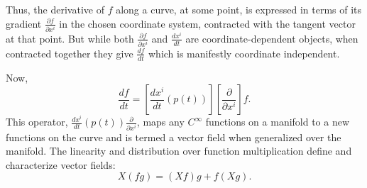 \documentclass{article}
\begin{document}
Thus, the derivative of $f$ along a curve, at some point, is expressed in terms of its gradient $\frac{\partial f}{\partial x^i}$ in the chosen coordinate system, contracted with the tangent vector at that point. But while both $\frac{\partial f}{\partial x^i}$ and $\frac{dx^i}{dt}$ are coordinate-dependent objects, when contracted together they give $\frac{df}{dt}$ which is manifestly coordinate independent. 

Now, 
\[
\frac{df}{dt} = \left[ \frac{dx^i}{dt} (p(t)) \right] \left[ \frac{\partial}{\partial x^i} \right] f.
\]
This operator, $\frac{dx^i}{dt} (p(t)) \frac{\partial}{\partial x^i}$, maps any $C^\infty$ functions on a manifold to a new functions on the curve and is termed a vector field when generalized over the manifold. The linearity and distribution over function multiplication define and characterize vector fields:
\[
X(fg) = (Xf)g + f(Xg).
\]
\end{document}
